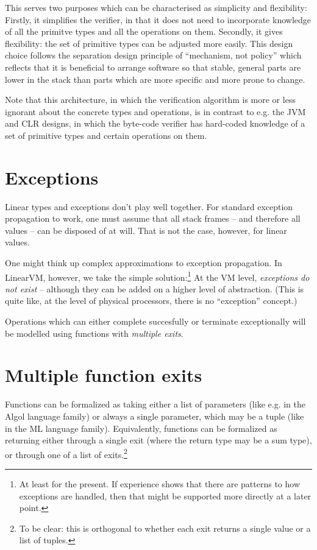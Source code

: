 \documentclass[a4paper]{book}
\begin{document}
This serves two purposes which can be characterised as simplicity and flexibility:
Firstly, it simplifies the verifier, in that it does not need to incorporate
knowledge of all the primitve types and all the operations on them.
Secondly, it gives flexibility: the set of primitive types can be adjusted
more easily.
This design choice follows the separation design principle of ``mechanism,
not policy'' which reflects that it is beneficial to arrange software so
that stable, general parts are lower in the stack than parts which are
more specific and more prone to change.

Note that this architecture, in which the verification algorithm is
more or less ignorant about the concrete types and operations,
is in contrast to e.g. the JVM and CLR designs, in which the
byte-code verifier has hard-coded knowledge of a set of primitive types
and certain operations on them.

\section{Exceptions}

Linear types and exceptions don't play well together.
For standard exception propagation to work, one must assume that
all stack frames -- and therefore all values -- can be disposed of at will.
That is not the case, however, for linear values.

One might think up complex approximations to exception propagation.
In LinearVM, however, we take the simple solution:\footnote{
At least for the present. If experience shows that there are patterns to how exceptions are handled, then that might be supported more directly at a later point.}
At the VM level, \emph{exceptions do not exist} -- although they can be added on
a higher level of abstraction.
(This is quite like, at the level of physical processors, there is no
``exception'' concept.)

Operations which can either complete succesfully or terminate exceptionally
will be modelled using functions with \emph{multiple exits}.

\section{Multiple function exits}
Functions can be formalized as taking either a list of
parameters (like e.g. in the Algol language family) or always a single
parameter, which may be a tuple (like in the ML language family).
Equivalently, functions can be formalized as returning either through
a single exit (where the return type may be a sum type), or through
one of a list of exits.\footnote{
To be clear: this is orthogonal to whether each exit returns a single
value or a list of tuples.}
\end{document}
